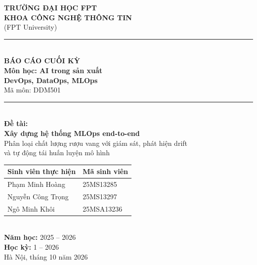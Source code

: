 \documentclass[12pt,a4paper]{report}
\begin{document}
\begin{titlepage}
  \centering
  \vspace*{1cm}

  {\Large\bfseries TRƯỜNG ĐẠI HỌC FPT}\\[0.3cm]
  {\large\bfseries KHOA CÔNG NGHỆ THÔNG TIN}\\[0.3cm]
  {\large (FPT University)}\\[1.5cm]

  \rule{\linewidth}{1.5pt}\\[0.4cm]
  {\Huge\bfseries\color{blue!70!black} BÁO CÁO CUỐI KỲ}\\[0.4cm]
  {\LARGE\bfseries Môn học: AI trong sản xuất}\\[0.2cm]
  {\LARGE\bfseries DevOps, DataOps, MLOps}\\[0.2cm]
  {\large Mã môn: DDM501}\\[0.4cm]
  \rule{\linewidth}{1.5pt}\\[1cm]

  {\Large\bfseries Đề tài:}\\[0.3cm]
  {\LARGE\bfseries Xây dựng hệ thống MLOps end-to-end}\\[0.2cm]
  {\large Phân loại chất lượng rượu vang với giám sát, phát hiện drift}\\[0.2cm]
  {\large và tự động tái huấn luyện mô hình}\\[2cm]

  \begin{tabular}{ll}
    \toprule
    \textbf{Sinh viên thực hiện} & \textbf{Mã sinh viên} \\
    \midrule
    Phạm Minh Hoàng     & 25MS13285  \\
    Nguyễn Công Trọng   & 25MS13297  \\
    Ngô Minh Khôi       & 25MSA13236 \\
    \bottomrule
  \end{tabular}\\[2cm]

  {\large \textbf{Năm học:} 2025 -- 2026}\\[0.5cm]
  {\large \textbf{Học kỳ:} 1 -- 2026}\\[2cm]

  {\large Hà Nội, tháng 10 năm 2026}
\end{titlepage}

\end{document}
